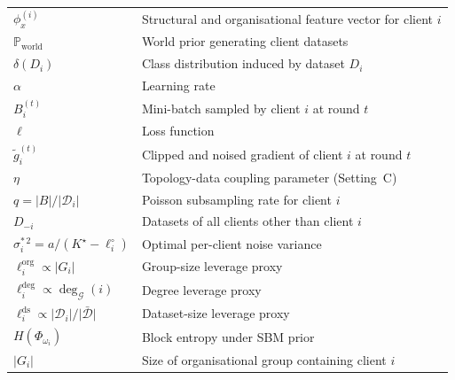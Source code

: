 \documentclass[letterpaper,journal]{IEEEtran}
\begin{document}
\begin{table}[h]
\begin{tabular}{@{}ll@{}}
$\phi_x^{(i)}$ & Structural and organisational feature vector for client $i$ \\
$\mathbb{P}_{\mathrm{world}}$ & World prior generating client datasets \\
$\delta(D_i)$ & Class distribution induced by dataset $D_i$ \\
$\alpha$ & Learning rate \\
$B_i^{(t)}$ & Mini-batch sampled by client $i$ at round $t$ \\
$\ell$ & Loss function \\
$\tilde{g}_i^{(t)}$ & Clipped and noised gradient of client $i$ at round $t$ \\
$\eta$ & Topology-data coupling parameter (Setting~C) \\
$q = |B|/|\mathcal{D}_i|$ & Poisson subsampling rate for client $i$ \\
$D_{-i}$ & Datasets of all clients other than client $i$ \\
$\sigma_i^{*\,2} = a/(K^\star - \ell_i^\circ)$ & Optimal per-client noise variance \\
$\ell_i^{\mathrm{org}} \propto |G_i|$ & Group-size leverage proxy \\
$\ell_i^{\mathrm{deg}} \propto \deg_{\mathcal{G}}(i)$ & Degree leverage proxy \\
$\ell_i^{\mathrm{ds}} \propto |\mathcal{D}_i|/\bar{|\mathcal{D}|}$ & Dataset-size leverage proxy \\
$H(\Phi_{\omega_i})$ & Block entropy under SBM prior \\
$|G_i|$ & Size of organisational group containing client $i$ \\
\bottomrule
\end{tabular}
\end{table}
\end{document}
